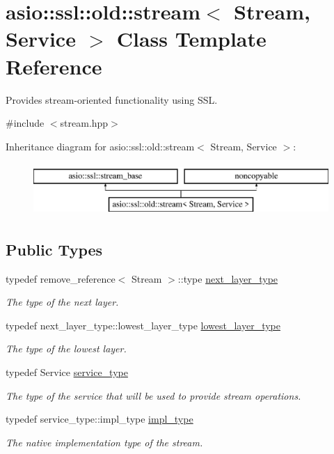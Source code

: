 \hypertarget{classasio_1_1ssl_1_1old_1_1stream}{}\section{asio\+:\+:ssl\+:\+:old\+:\+:stream$<$ Stream, Service $>$ Class Template Reference}
\label{classasio_1_1ssl_1_1old_1_1stream}


Provides stream-\/oriented functionality using S\+S\+L.  




{\ttfamily \#include $<$stream.\+hpp$>$}

Inheritance diagram for asio\+:\+:ssl\+:\+:old\+:\+:stream$<$ Stream, Service $>$\+:\begin{figure}[H]
\begin{center}
\leavevmode
\includegraphics[height=2.000000cm]{classasio_1_1ssl_1_1old_1_1stream}
\end{center}
\end{figure}
\subsection*{Public Types}
\begin{DoxyCompactItemize}
\item 
typedef remove\+\_\+reference$<$ Stream $>$\+::type \hyperlink{classasio_1_1ssl_1_1old_1_1stream_a71ae7adcbd44cae6750157541c2ddf8e}{next\+\_\+layer\+\_\+type}
\begin{DoxyCompactList}\small\item\em The type of the next layer. \end{DoxyCompactList}\item 
typedef next\+\_\+layer\+\_\+type\+::lowest\+\_\+layer\+\_\+type \hyperlink{classasio_1_1ssl_1_1old_1_1stream_a6b664149066b698269db4e2f4e846ca2}{lowest\+\_\+layer\+\_\+type}
\begin{DoxyCompactList}\small\item\em The type of the lowest layer. \end{DoxyCompactList}\item 
typedef Service \hyperlink{classasio_1_1ssl_1_1old_1_1stream_a2e027ffad5f6a2acd99689211e717ac5}{service\+\_\+type}
\begin{DoxyCompactList}\small\item\em The type of the service that will be used to provide stream operations. \end{DoxyCompactList}\item 
typedef service\+\_\+type\+::impl\+\_\+type \hyperlink{classasio_1_1ssl_1_1old_1_1stream_a965fd8deeebbf308d18fbac925009d8d}{impl\+\_\+type}
\begin{DoxyCompactList}\small\item\em The native implementation type of the stream. \end{DoxyCompactList}\end{DoxyCompactItemize}
